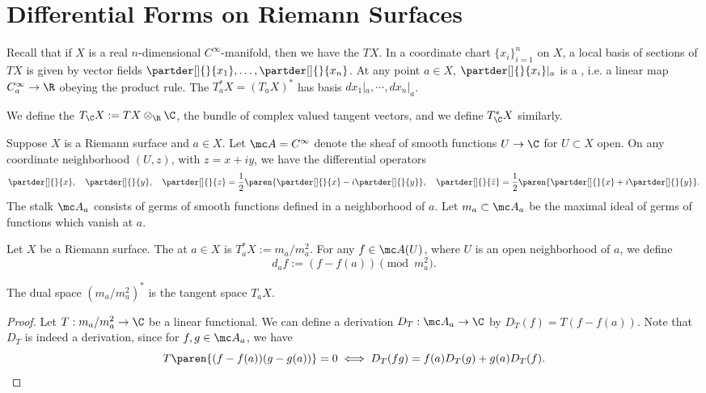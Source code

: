 \documentclass[11pt]{report}
\begin{document}
\section{Differential Forms on Riemann Surfaces}

\begin{defn}
Recall that if $X$ is a real $n$-dimensional $C^\infty$-manifold, then we have the  $TX$. In a coordinate chart $\{x_i\}_{i=1}^n$ on $X$, a local basis of sections of $TX$ is given by vector fields $\partder[]{}{x_1},\dots,\partder[]{}{x_n}$. At any point $a \in X$, $\partder[]{}{x_i}|_a$ is a , i.e. a linear map $C_a^\infty \to \R$ obeying the product rule. The  $T_a^*X = (T_aX)^*$ has basis $dx_1|_a,\dotsm,dx_n|_a$.

We define the  $T_\C X:=TX \otimes _\R \C$, the bundle of complex valued tangent vectors, and we define $T_\C^*X$ similarly.
\end{defn}

Suppose $X$ is a Riemann surface and $a \in X$. Let $\mc A = C^\infty$ denote the sheaf of smooth functions $U \to \C$ for $U \subset X$ open. On any coordinate neighborhood $(U,z)$, with $z = x+iy$, we have the differential operators
\[
\partder[]{}{x}, \quad \partder[]{}{y}, \quad \partder[]{}{z}=\frac{1}{2}\paren{\partder[]{}{x}-i \partder[]{}{y}},\quad \partder[]{}{\bar z}=\frac{1}{2}\paren{\partder[]{}{x}+i \partder[]{}{y}}.
\]
The stalk $\mc A_a$ consists of germs of smooth functions defined in a neighborhood of $a$. Let $m_a \subset \mc A_a$ be the maximal ideal of germs of functions which vanish at $a$.

\begin{defn}
Let $X$ be a Riemann surface. The  at $a \in X$ is $T_a^* X:= m_a/m_a^2$. For any $f \in \mc A(U)$, where $U$ is an open neighborhood of $a$, we define
\[
d_af:= (f-f(a)) \pmod {m_a^2}.
\]
\end{defn}

\begin{prop}
The dual space $(m_a/m_a^2)^*$ is the tangent space $T_aX$.
\end{prop}

\begin{proof}
Let $T: m_a/m_a^2 \to \C$ be a linear functional. We can define a derivation $D_T:\mc A_a \to \C$ by $D_T(f) = T(f-f(a))$. Note that $D_T$ is indeed a derivation, since for $f,g \in \mc A_a$, we have
\[
T\paren{ (f-f(a))(g-g(a)) }=0 \iff D_T(fg)=f(a)D_T(g)+ g(a)D_T(f).
\]
\end{proof}
\end{document}
